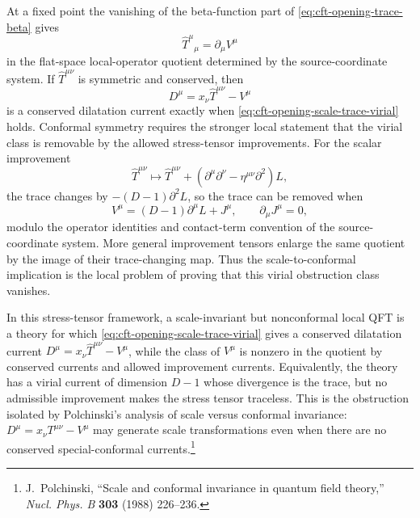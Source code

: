 \begin{remark}
\label{rem:cft-opening-scale-versus-conformal}
At a fixed point the vanishing of the beta-function part of
\eqref{eq:cft-opening-trace-beta} gives
\begin{equation}
  \widehat T^\mu{}_\mu=\partial_\mu V^\mu
  \label{eq:cft-opening-scale-trace-virial}
\end{equation}
in the flat-space local-operator quotient determined by the source-coordinate system.  If
\(\widehat T^{\mu\nu}\) is symmetric and conserved, then
\begin{equation}
  D^\mu=x_\nu\widehat T^{\mu\nu}-V^\mu
  \label{eq:cft-opening-dilatation-current}
\end{equation}
is a conserved dilatation current exactly when
\eqref{eq:cft-opening-scale-trace-virial} holds.  Conformal symmetry requires
the stronger local statement that the virial class is removable by the allowed
stress-tensor improvements.  For the scalar improvement
\[
  \widehat T^{\mu\nu}\longmapsto
  \widehat T^{\mu\nu}
  +
  (\partial^\mu\partial^\nu-\eta^{\mu\nu}\partial^2)L ,
\]
the trace changes by \(-(D-1)\partial^2L\), so the trace can be removed when
\begin{equation}
  V^\mu=(D-1)\partial^\mu L+J^\mu,
  \qquad
  \partial_\mu J^\mu=0,
  \label{eq:cft-opening-removable-virial}
\end{equation}
modulo the operator identities and contact-term convention of the source-coordinate system.
More general improvement tensors enlarge the same quotient by the image of
their trace-changing map.  Thus the scale-to-conformal implication is the
local problem of proving that this virial obstruction class vanishes.

In this stress-tensor framework, a scale-invariant but nonconformal local QFT
is a theory for which \eqref{eq:cft-opening-scale-trace-virial} gives a
conserved dilatation current \(D^\mu=x_\nu\widehat T^{\mu\nu}-V^\mu\), while
the class of \(V^\mu\) is nonzero in the quotient by conserved currents and
allowed improvement currents.  Equivalently, the theory has a virial current
of dimension \(D-1\) whose divergence is the trace, but no admissible
improvement makes the stress tensor traceless.  This is the obstruction
isolated by Polchinski's analysis of scale versus conformal invariance:
\(D^\mu=x_\nu T^{\mu\nu}-V^\mu\) may generate scale transformations even when
there are no conserved special-conformal currents.\footnote{J.~Polchinski,
``Scale and conformal invariance in quantum field theory,'' \emph{Nucl. Phys.
B} \textbf{303} (1988) 226--236.}


\end{remark}
